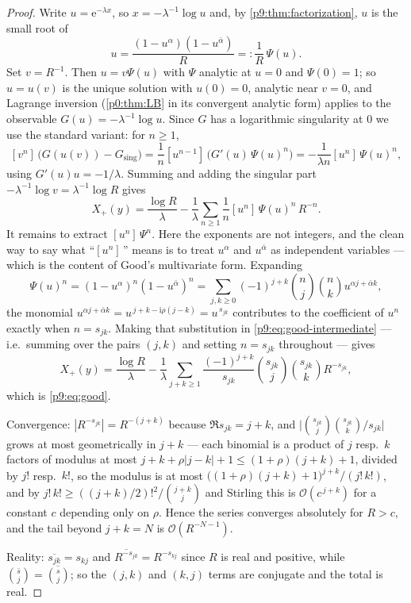 \documentclass[11pt,a4paper,oneside]{book}
\theoremstyle{plain}
\theoremstyle{definition}
\theoremstyle{remark}
\newcommand{\e}{\mathrm{e}}
\newcommand{\ii}{\mathrm{i}}
\newcommand{\Coef}[1]{[#1]\,}
\newcommand{\bigO}{\mathcal{O}}
\begin{document}
\begin{proof}
Write $u=\e^{-\lambda x}$, so $x=-\lambda^{-1}\log u$ and, by
\cref{p9:thm:factorization}, $u$ is the small root of
\begin{equation}\label{p9:eq:fixed-point}
 u=\frac{(1-u^{\alpha})(1-u^{\bar\alpha})}{R}
 =:\frac1R\,\Psi(u).
\end{equation}
Set $v=R^{-1}$.  Then $u=v\Psi(u)$ with $\Psi$ analytic at $u=0$ and
$\Psi(0)=1$; so $u=u(v)$ is the unique solution with $u(0)=0$, analytic near
$v=0$, and Lagrange inversion (\cref{p0:thm:LB} in its convergent analytic
form) applies to the observable $G(u)=-\lambda^{-1}\log u$.  Since $G$ has a
logarithmic singularity at $0$ we use the standard variant: for
$n\ge1$,
\[
 \Coef{v^{n}}\bigl(G(u(v))-G_{\mathrm{sing}}\bigr)
 =\frac1n\Coef{u^{n-1}}\bigl(G'(u)\,\Psi(u)^{n}\bigr)
 =-\frac1{\lambda n}\Coef{u^{n}}\Psi(u)^{n},
\]
using $G'(u)u=-1/\lambda$.  Summing and adding the singular part
$-\lambda^{-1}\log v=\lambda^{-1}\log R$ gives
\begin{equation}\label{p9:eq:good-intermediate}
 X_+(y)=\frac{\log R}{\lambda}
 -\frac1\lambda\sum_{n\ge1}\frac1n\Coef{u^{n}}\Psi(u)^{n}\,R^{-n} .
\end{equation}
It remains to extract $\Coef{u^{n}}\Psi^{n}$.  Here the exponents are not
integers, and the clean way to say what ``$\Coef{u^{n}}$'' means is to treat
$u^{\alpha}$ and $u^{\bar\alpha}$ as independent variables --- which is the
content of Good's multivariate form.  Expanding
\[
 \Psi(u)^{n}=(1-u^{\alpha})^{n}(1-u^{\bar\alpha})^{n}
 =\sum_{j,k\ge0}(-1)^{j+k}\binom nj\binom nk u^{\alpha j+\bar\alpha k},
\]
the monomial $u^{\alpha j+\bar\alpha k}=u^{\,j+k-\ii\rho(j-k)}=u^{\,s_{jk}}$
contributes to the coefficient of $u^{n}$ exactly when $n=s_{jk}$.  Making
that substitution in \eqref{p9:eq:good-intermediate} --- i.e.\ summing over the
pairs $(j,k)$ and setting $n=s_{jk}$ throughout --- gives
\[
 X_+(y)=\frac{\log R}{\lambda}
 -\frac1\lambda\sum_{j+k\ge1}\frac{(-1)^{j+k}}{s_{jk}}
 \binom{s_{jk}}{j}\binom{s_{jk}}{k}R^{-s_{jk}},
\]
which is \eqref{p9:eq:good}.

Convergence: $|R^{-s_{jk}}|=R^{-(j+k)}$ because $\Re s_{jk}=j+k$, and
$\bigl|\binom{s_{jk}}{j}\binom{s_{jk}}{k}/s_{jk}\bigr|$ grows at most
geometrically in $j+k$ --- each binomial is a product of $j$ resp.\ $k$
factors of modulus at most $j+k+\rho|j-k|+1\le(1+\rho)(j+k)+1$, divided by
$j!$ resp.\ $k!$, so the modulus is at most
$\bigl((1+\rho)(j+k)+1\bigr)^{j+k}/(j!\,k!)$, and by
$j!\,k!\ge((j+k)/2)!^{2}/\binom{j+k}{j}$ and Stirling this is
$\bigO(c^{\,j+k})$ for a constant $c$ depending only on $\rho$.  Hence the
series converges absolutely for $R>c$, and the tail beyond $j+k=N$ is
$\bigO(R^{-N-1})$.

Reality: $\overline{s_{jk}}=s_{kj}$ and $\overline{R^{-s_{jk}}}=R^{-s_{kj}}$
since $R$ is real and positive, while $\binom{\bar s}{j}=\overline{\binom sj}$;
so the $(j,k)$ and $(k,j)$ terms are conjugate and the total is real.
\end{proof}
\end{document}
